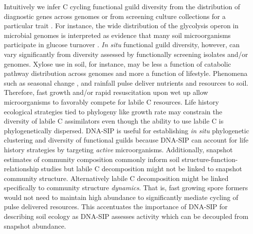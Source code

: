 Intuitively we infer C cycling functional guild diversity from the distribution
of diagnostic genes across genomes \citep{Berlemont2013} or from screening
culture collections for a particular trait \citep{Martiny2013}. For
instance, the wide distribution of the glycolysis operon in microbial
genomes is interpreted as evidence that many soil microorganisms
participate in glucose turnover \citep{McGuire2010}. \textit{In situ}
functional guild diversity, however, can vary significantly from diversity
assessed by functionally screening isolates and/or genomes. Xylose use in soil,
for instance, may be less a function of catabolic pathway distribution across
genomes and more a function of lifestyle. Phenomena such as seasonal change
\citep{Schmidt2007}, and rainfall \citep{Placella2012} pulse deliver nutrients
and resources to soil. Therefore, fast growth and/or rapid resuscitation upon
wet up \citep{Placella2012} allow microorganisms to favorably compete for
labile C resources. Life history ecological strategies tied to phylogeny like
growth rate \cite{Fierer2007} may constrain the diversity of labile
C assimilators even though the ability to use labile C is phylogenetically
dispersed. DNA-SIP is useful for establishing \textit{in situ} phylogenetic
clustering and diversity of functional guilds because DNA-SIP can account for
life history strategies by targeting \textit{active} microorganisms.
Additionally, snapshot estimates of community composition commonly inform soil
structure-function-relationship studies \citep{Fierer2007} but labile
C decomposition might not be linked to snapshot community structure.
Alternatively labile C decomposition might be linked specifically to community
structure \textit{dynamics}. That is, fast growing spore formers would not need
to maintain high abundance to significantly mediate cycling of pulse delivered
resources. This accentuates the importance of DNA-SIP for describing soil
ecology as DNA-SIP assesses activity which can be decoupled from snapshot
abundance.

